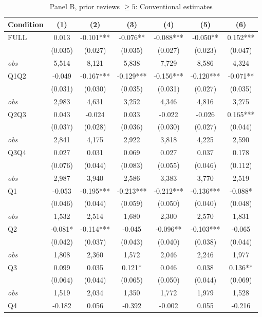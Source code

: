 \documentclass[11pt]{article}
\begin{document}
\begin{table}[!htbp]
\centering
\caption{Panel B, prior reviews $\geq 5$: Conventional estimates}
\label{tab:trim00:b:prior_reviews_ge5}
\small
\begin{tabular}{lcccccc}
\toprule
Condition & (1) & (2) & (3) & (4) & (5) & (6) \\
\midrule
FULL & 0.013 & -0.101*** & -0.076** & -0.088*** & -0.050** & 0.152*** \\
 & (0.035) & (0.027) & (0.035) & (0.027) & (0.023) & (0.047) \\
\textit{obs} & 5,514 & 8,121 & 5,838 & 7,729 & 8,586 & 4,324 \\
Q1Q2 & -0.049 & -0.167*** & -0.129*** & -0.156*** & -0.120*** & -0.071** \\
 & (0.031) & (0.030) & (0.035) & (0.031) & (0.027) & (0.035) \\
\textit{obs} & 2,983 & 4,631 & 3,252 & 4,346 & 4,816 & 3,275 \\
Q2Q3 & 0.043 & -0.024 & 0.033 & -0.022 & -0.026 & 0.165*** \\
 & (0.037) & (0.028) & (0.036) & (0.030) & (0.027) & (0.044) \\
\textit{obs} & 2,841 & 4,175 & 2,922 & 3,818 & 4,225 & 2,590 \\
Q3Q4 & 0.027 & 0.031 & 0.069 & 0.027 & 0.037 & 0.178 \\
 & (0.076) & (0.044) & (0.083) & (0.055) & (0.046) & (0.112) \\
\textit{obs} & 2,987 & 3,940 & 2,586 & 3,383 & 3,770 & 2,519 \\
Q1 & -0.053 & -0.195*** & -0.213*** & -0.212*** & -0.136*** & -0.088* \\
 & (0.046) & (0.044) & (0.059) & (0.050) & (0.040) & (0.048) \\
\textit{obs} & 1,532 & 2,514 & 1,680 & 2,300 & 2,570 & 1,831 \\
Q2 & -0.081* & -0.114*** & -0.045 & -0.096** & -0.103*** & -0.065 \\
 & (0.042) & (0.037) & (0.043) & (0.040) & (0.038) & (0.044) \\
\textit{obs} & 1,808 & 2,360 & 1,572 & 2,046 & 2,246 & 1,977 \\
Q3 & 0.099 & 0.035 & 0.121* & 0.046 & 0.038 & 0.136** \\
 & (0.064) & (0.044) & (0.065) & (0.050) & (0.044) & (0.069) \\
\textit{obs} & 1,519 & 2,034 & 1,350 & 1,772 & 1,979 & 1,528 \\
Q4 & -0.182 & 0.056 & -0.392 & -0.002 & 0.055 & -0.216 \\

\end{tabular}
\end{table}
\end{document}
